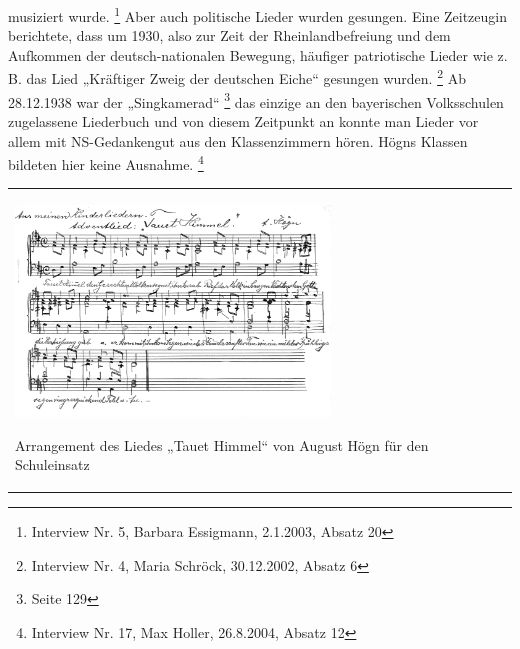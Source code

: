 musiziert wurde. \footnote{Interview Nr. 5, Barbara Essigmann,
2.1.2003, Absatz 20} Aber auch politische Lieder wurden gesungen. Eine
Zeitzeugin berichtete, dass um 1930, also zur Zeit der
Rheinlandbefreiung und dem Aufkommen der deutsch-nationalen Bewegung,
häufiger patriotische Lieder wie z. B. das Lied „Kräftiger Zweig der
deutschen Eiche“ gesungen wurden. \footnote{Interview Nr. 4, Maria
Schröck, 30.12.2002, Absatz 6} Ab 28.12.1938 war der „Singkamerad“
 \footnote{Seite 129} das einzige an den bayerischen Volksschulen
zugelassene Liederbuch und von diesem Zeitpunkt an konnte man Lieder
vor allem mit NS-Gedankengut aus den Klassenzimmern hören. Högns
Klassen bildeten hier keine Ausnahme. \footnote{Interview Nr. 17, Max
Holler, 26.8.2004, Absatz 12}

\begin{center}
\begin{minipage}{8.807cm}
\begin{flushleft}
\tablefirsthead{}
\tablehead{}
\tabletail{}
\tablelasttail{}
\begin{supertabular}{m{8.607cm}}

\includegraphics[width=8.373cm,height=5.604cm]{pictures/zulassungsarbeit-img033.png}

Arrangement des Liedes „Tauet Himmel“
von August Högn für den Schuleinsatz\\
\end{supertabular}
\end{flushleft}
\end{minipage}
\end{center}

